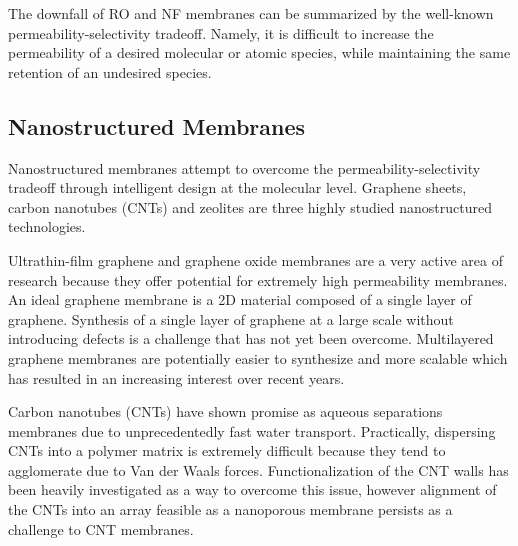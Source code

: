 \documentclass{article}
\begin{document}
  The downfall of RO and NF membranes can be summarized by the well-known
  permeability-selectivity tradeoff. Namely, it is difficult to increase the
  permeability of a desired molecular or atomic species, while maintaining
  the same retention of 
an undesired species.\cite{werber_materials_2016}  
  
  \subsection*{Nanostructured Membranes}
  
  Nanostructured membranes attempt to overcome the permeability-selectivity 
  tradeoff through intelligent design at the molecular level. Graphene sheets, 
  carbon nanotubes (CNTs) and zeolites are three highly studied nanostructured
  technologies.

  Ultrathin-film graphene and graphene oxide membranes are a very active
  area of research because they offer potential for extremely high 
  permeability membranes. An ideal graphene membrane is a 2D material 
  composed of a single layer of graphene.\cite{humplik_nanostructured_2011}
  Synthesis of a single layer of graphene at a large scale without introducing
  defects is a challenge that has not yet been overcome. Multilayered graphene
  membranes are potentially easier to synthesize and more scalable which has 
  resulted in an increasing interest over recent years.\cite{cohen-tanugi_multilayer_2016,wei_multilayered_2018}
  
  Carbon nanotubes (CNTs) have shown promise as aqueous separations membranes
  due to unprecedentedly fast water transport.\cite{humplik_nanostructured_2011,hummer_water_2001} 
  Practically, dispersing CNTs into a polymer matrix is extremely difficult
  because they tend to agglomerate due to Van der Waals forces. Functionalization
  of the CNT walls has been heavily investigated  as a way to overcome this issue, however 
  alignment of the CNTs into an array feasible as a nanoporous membrane 
  persists as a challenge to CNT membranes.\cite{sahoo_polymer_2010}
   
\end{document}
